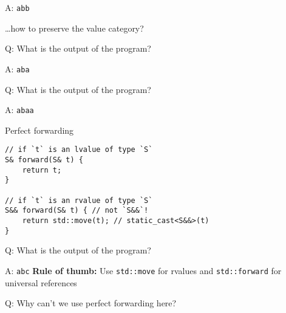 \begin{frame}[fragile]{A: \texttt{abb}}

    \hfill \ldots how to preserve the value category?
\end{frame}

\begin{frame}[fragile]{Q: What is the output of the program?}
\end{frame}

\begin{frame}[fragile]{A: \texttt{aba}}
\end{frame}

\begin{frame}[fragile]{Q: What is the output of the program?}
\end{frame}

\begin{frame}[fragile]{A: \texttt{abaa}}
\end{frame}

\begin{frame}[fragile]{Perfect forwarding}
    \centering
    \scalebox{1.5}{How do we fuse these implementations?}

    \begin{lstlisting}
// if `t` is an lvalue of type `S`
S& forward(S& t) {
    return t;
}

// if `t` is an rvalue of type `S`
S&& forward(S& t) { // not `S&&`!
    return std::move(t); // static_cast<S&&>(t)
}
    \end{lstlisting}

\end{frame}

\begin{frame}[fragile]{Q: What is the output of the program?}
\end{frame}

\begin{frame}[fragile]{A: \texttt{abc}}
    \textbf{Rule of thumb:} Use \texttt{std::move} for rvalues and \texttt{std::forward} for universal references
\end{frame}

\begin{frame}[fragile]{Q: Why can't we use perfect forwarding here?}

\end{frame}

